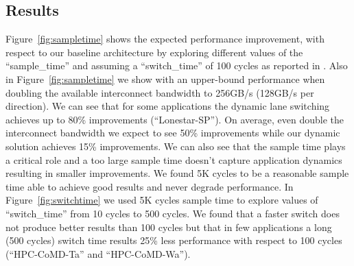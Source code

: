 \subsection{Results}
Figure~\ref{fig:sampletime} shows the expected performance improvement, with 
respect to our baseline architecture by exploring different values 
of the ``sample\_time'' and assuming a ``switch\_time'' of 100 cycles 
as reported in \cite{REALLY_NEED_REF_HERE}. Also in Figure~\ref{fig:sampletime}
we show with an upper-bound performance when doubling
the available interconnect bandwidth to 256GB/s (128GB/s per direction). 
We can see that for some applications the dynamic lane switching achieves up to
80\% improvements (``Lonestar-SP''). On average, even double the interconnect 
bandwidth we expect to see 50\% improvements while our dynamic solution 
achieves 15\% improvements. We can also see that the sample time plays a 
critical role and a too large sample time doesn't capture application dynamics 
resulting in smaller improvements. We found 5K cycles to be a reasonable sample
time able to achieve good results and never degrade performance. 
In Figure~\ref{fig:switchtime} we used 5K cycles sample time to
explore values of ``switch\_time'' from 10 cycles to 500 cycles.
We found that a faster switch does not produce better results than 100 cycles
but that in few applications a long (500 cycles) switch time results 25\% 
less performance with respect to 100 cycles (``HPC-CoMD-Ta'' and 
``HPC-CoMD-Wa'').






